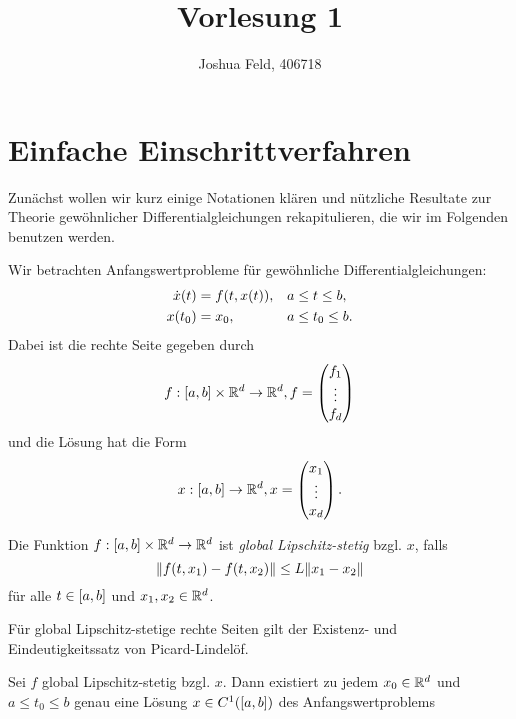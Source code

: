 \documentclass{lecture}
\title{Vorlesung 1}
\author{Joshua Feld, 406718}
\begin{document}
	\maketitle


	\tableofcontents


	\section{Einfache Einschrittverfahren}

	Zunächst wollen wir kurz einige Notationen klären und nützliche Resultate zur Theorie gewöhnlicher Differentialgleichungen rekapitulieren, die wir im Folgenden benutzen werden.

	Wir betrachten Anfangswertprobleme für gewöhnliche Differentialgleichungen:
	\begin{equation}
		\begin{alignedat}{2}
			\dot{x}\parentheses*{t} &= f\parentheses*{t, x\parentheses*{t}}, \quad & &a \le t \le b,\\
			x\parentheses*{t_0} &= x_0, & &a \le t_0 \le b.
		\end{alignedat}
	\end{equation}
	Dabei ist die rechte Seite gegeben durch
	\[
		f: \brackets*{a, b} \times \R^d \to \R^d, f = \begin{pmatrix}
			f_1\\
			\vdots\\
			f_d
		\end{pmatrix}
	\]
	und die Lösung hat die Form
	\[
		x: \brackets*{a, b} \to \R^d, x = \begin{pmatrix}
			x_1\\
			\vdots\\
			x_d
		\end{pmatrix}.
	\]

	\begin{definition}
		Die Funktion \(f: \brackets*{a, b} \times \R^d \to \R^d\) ist \emph{global Lipschitz-stetig} bzgl. \(x\), falls
		\begin{equation}
			\norm*{f\parentheses*{t, x_1} - f\parentheses*{t, x_2}} \le L\norm*{x_1 - x_2}
		\end{equation}
		für alle \(t \in \brackets*{a, b}\) und \(x_1, x_2 \in \R^d\).
	\end{definition}

	Für global Lipschitz-stetige rechte Seiten gilt der Existenz- und Eindeutigkeitssatz von Picard-Lindelöf.

	\begin{proposition}
		Sei \(f\) global Lipschitz-stetig bzgl. \(x\).
		Dann existiert zu jedem \(x_0 \in \R^d\) und \(a \le t_0 \le b\) genau eine Lösung \(x \in C^1\parentheses*{\brackets*{a, b}}\) des Anfangswertproblems 
	\end{proposition}
\end{document}
